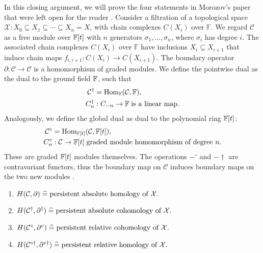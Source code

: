 In this closing argument, we will prove the four statements in Morozov's paper that were left open for the reader \cite[\S 2.8]{de2011dualities}. Consider a filtration of a topological space $ \mathcal{X} : X_0 \subseteq X_1 \subseteq \cdots \subseteq X_n = X$, with chain complexes \( C(X_i) \) over \( \mathbb{F} \). We regard $\mathcal{C}$ as a free module over ${\mathbb{F}}[t]$ with $n$ generators $\sigma_1, \ldots, \sigma_n$, where $\sigma_i$ has degree $i$. The associated chain complexes \( C(X_i) \) over \( \mathbb{F} \) have inclusions \( X_i \subseteq X_{i+1} \) that induce chain maps \( f_{i,i+1}: C(X_i) \to C(X_{i+1}) \). The boundary operator $\partial: \mathcal{C} \rightarrow \mathcal{C}$ is a homomorphism of graded modules. We define the pointwise dual as the dual to the ground field ${\mathbb{F}}$, such that
\begin{align}
\mathcal{C}^\dagger &= {\mathrm{Hom}}_{\mathbb{F}}(\mathcal{C},{\mathbb{F}}), \\
C^\dagger_n&: C_{-n} \rightarrow {\mathbb{F}} \; \text{is a linear map.}
\end{align}
Analogously, we define the global dual as dual to the polynomial ring ${\mathbb{F}}[t]$:
\begin{align}
\mathcal{C}^\circ &= {\mathrm{Hom}}_{{\mathbb{F}}[t]}(\mathcal{C},{\mathbb{F}}[t]), \\
C^\circ_n&: \mathcal{C} \rightarrow {\mathbb{F}}[t] \; \text{graded module homomorphism of degree $n$.}
\end{align}
These are graded ${\mathbb{F}}[t]$ modules themselves. The operations $-^\circ$ and $-\dagger$ are contravariant functors, thus the boundary map on $\mathcal{C}$ induces boundary maps on the two new modules \cite[\S 2.8]{de2011dualities}.

\begin{corollary}\noindent
\begin{enumerate}
\item \(H(\mathcal{C}, \partial) \; \widehat{=} \; \text{persistent absolute homology\index{homology} of } \mathcal{X}.\)
\item \(H(\mathcal{C}^\dagger, \partial^\dagger) \; \widehat{=} \; \text{persistent absolute cohomology\index{cohomology} of } \mathcal{X}.\)
\item \(H(\mathcal{C}^\circ, \partial^\circ) \; \widehat{=} \; \text{persistent relative cohomology\index{cohomology} of } \mathcal{X}.\)
\item \(H(\mathcal{C}^{\circ\dagger}, \partial^{\circ\dagger}) \; \widehat{=} \; \text{persistent relative homology\index{homology} of } \mathcal{X}.\)
\end{enumerate}
\end{corollary}


